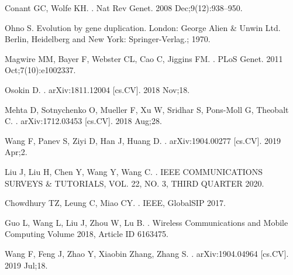 \documentclass[10pt,letterpaper]{article}
\begin{document}
	\begin{thebibliography}{10}
		
		Conant GC, Wolfe KH.
		.
		\newblock Nat Rev Genet. 2008 Dec;9(12):938--950.
		
		Ohno S.
		\newblock Evolution by gene duplication.
		\newblock London: George Alien \& Unwin Ltd. Berlin, Heidelberg and New York:
		Springer-Verlag.; 1970.
		
		Magwire MM, Bayer F, Webster CL, Cao C, Jiggins FM.
		.
		\newblock PLoS Genet. 2011 Oct;7(10):e1002337.
		
		
		
		
		Osokin D.
		.
		\newblock arXiv:1811.12004 [cs.CV]. 2018 Nov;18.
		
		Mehta D, Sotnychenko O, Mueller F, Xu W, Sridhar S, Pons-Moll G, Theobalt C.
		.
		\newblock arXiv:1712.03453 [cs.CV]. 2018 Aug;28.
		
		
		Wang F, Panev S, Ziyi D, Han J, Huang D.
		.
		\newblock arXiv:1904.00277 [cs.CV]. 2019 Apr;2.
		
		
		
		Liu J, Liu H, Chen Y, Wang Y, Wang C.
		.
		\newblock IEEE COMMUNICATIONS SURVEYS \& TUTORIALS, VOL. 22, NO. 3, THIRD QUARTER 2020.
		
		Chowdhury TZ, Leung C, Miao CY.
		.
		\newblock IEEE, GlobalSIP 2017.
		
		
		Guo L, Wang L, Liu J, Zhou W, Lu B.
		.
		\newblock Wireless Communications and Mobile Computing
		Volume 2018, Article ID 6163475.
		
		
		
		Wang F, Feng J, Zhao Y, Xiaobin Zhang, Zhang S.
		.
		\newblock arXiv:1904.04964 [cs.CV]. 2019 Jul;18.
		

\end{thebibliography}
\end{document}
